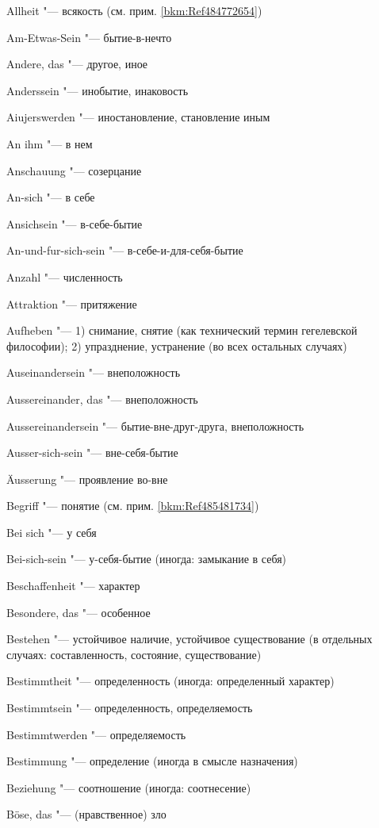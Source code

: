 {{\begin{multicols}{2}
Allheit "--- всякость (см. прим. \ref{bkm:Ref484772654})

Am-Etwas-Sein "--- бытие-в-нечто

Andere, das "--- другое, иное

Anderssein "--- инобытие, инаковость

Aiujerswerden "--- иностановление, становление иным

An ihm "--- в нем

Anschauung "--- созерцание

An-sich "--- в себе

Ansichsein "--- в-себе-бытие

An-und-fur-sich-sein "--- в-себе-и-для-себя-бытие

Anzahl "--- численность

Attraktion "--- притяжение

Aufheben "--- 1) снимание, снятие (как технический термин гегелевской
философии); 2) упразднение, устранение (во всех остальных случаях)

Auseinandersein "--- внеположность

Aussereinander, das "--- внеположность

Aussereinandersein "--- бытие-вне-друг-друга, внеположность

Ausser-sich-sein "--- вне-себя-бытие

Äusserung "--- проявление во-вне

\bigskip

Begriff "--- понятие (см. прим. \ref{bkm:Ref485481734})

Bei sich "--- у себя

Bei-sich-sein "--- у-себя-бытие (иногда: замыкание в себя)

Beschaffenheit "--- характер

Besondere, das "--- особенное

Bestehen "--- устойчивое наличие, устойчивое существование (в
отдельных случаях: составленность, состояние, существование)

Bestimmtheit "--- определенность (иногда: определенный характер)

Bestimmtsein "--- определенность, определяемость

Bestimmtwerden "--- определяемость

Bestimmung "--- определение (иногда в смысле назначения)

Beziehung "--- соотношение (иногда: соотнесение)

Böse, das "--- (нравственное) зло


\end{multicols}}}
